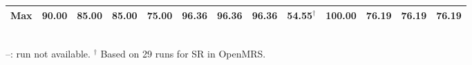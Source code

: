 \begin{table}
{\begin{tabular}{|c|cccc|cccc|cccc|}
\textbf{Max} & \textbf{90.00} & \textbf{85.00} & \textbf{85.00} & \textbf{75.00} & \textbf{96.36} & \textbf{96.36} & \textbf{96.36} & \textbf{54.55}$^{\dagger}$ & \textbf{100.00} & \textbf{76.19} & \textbf{76.19} & \textbf{76.19} \\
\hline
\end{tabular}}
\\[2pt]
\footnotesize{--: run not available. $^{\dagger}$ Based on 29 runs for SR in OpenMRS.}
\end{table}
